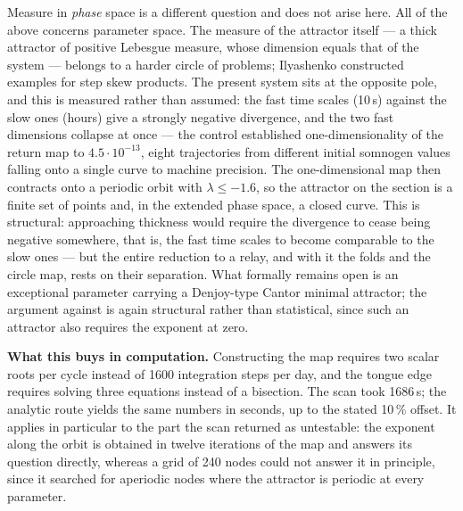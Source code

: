 \begin{ineq}
Measure in \emph{phase} space is a different question and does not arise here. All of the above concerns parameter space. The measure of the attractor itself --- a thick attractor of positive Lebesgue measure, whose dimension equals that of the system --- belongs to a harder circle of problems; Ilyashenko constructed examples for step skew products. The present system sits at the opposite pole, and this is measured rather than assumed: the fast time scales (10\,s) against the slow ones (hours) give a strongly negative divergence, and the two fast dimensions collapse at once --- the control established one-dimensionality of the return map to $4.5\cdot10^{-13}$, eight trajectories from different initial somnogen values falling onto a single curve to machine precision. The one-dimensional map then contracts onto a periodic orbit with $\lambda\le-1.6$, so the attractor on the section is a finite set of points and, in the extended phase space, a closed curve. This is structural: approaching thickness would require the divergence to cease being negative somewhere, that is, the fast time scales to become comparable to the slow ones --- but the entire reduction to a relay, and with it the folds and the circle map, rests on their separation. What formally remains open is an exceptional parameter carrying a Denjoy-type Cantor minimal attractor; the argument against is again structural rather than statistical, since such an attractor also requires the exponent at zero.
\end{ineq}

\textbf{What this buys in computation.} Constructing the map requires two scalar roots per cycle instead of 1600 integration steps per day, and the tongue edge requires solving three equations instead of a bisection. The scan took 1686\,s; the analytic route yields the same numbers in seconds, up to the stated 10\,\% offset. It applies in particular to the part the scan returned as untestable: the exponent along the orbit is obtained in twelve iterations of the map and answers its question directly, whereas a grid of 240 nodes could not answer it in principle, since it searched for aperiodic nodes where the attractor is periodic at every parameter.
